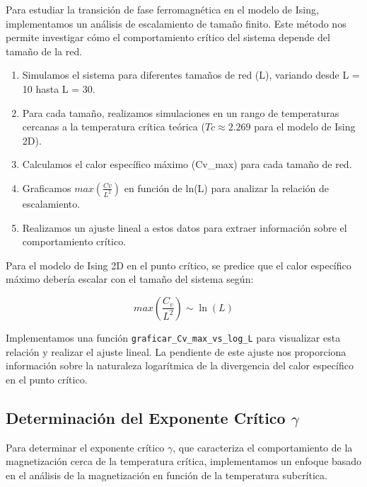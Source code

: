 \documentclass[twocolumn]{article}
\begin{document}
Para estudiar la transición de fase ferromagnética en el modelo de Ising, implementamos un análisis de escalamiento de tamaño finito. Este método nos permite investigar cómo el comportamiento crítico del sistema depende del tamaño de la red.

\begin{enumerate}
    \item Simulamos el sistema para diferentes tamaños de red (L), variando desde L = 10 hasta L = 30.
    \item Para cada tamaño, realizamos simulaciones en un rango de temperaturas cercanas a la temperatura crítica teórica ($Tc \approx 2.269$ para el modelo de Ising 2D).
    \item Calculamos el calor específico máximo (Cv\_max) para cada tamaño de red.
    \item Graficamos $max(\frac{Cv}{L^2})$ en función de ln(L) para analizar la relación de escalamiento.
    \item Realizamos un ajuste lineal a estos datos para extraer información sobre el comportamiento crítico.
\end{enumerate}

Para el modelo de Ising 2D en el punto crítico, se predice que el calor específico máximo debería escalar con el tamaño del sistema según:

\begin{equation}
    max(\frac{C_v}{L^2}) \sim \ln(L)
\end{equation}

Implementamos una función \texttt{graficar\_Cv\_max\_vs\_log\_L} para visualizar esta relación y realizar el ajuste lineal. La pendiente de este ajuste nos proporciona información sobre la naturaleza logarítmica de la divergencia del calor específico en el punto crítico.
 

\subsection*{Determinación del Exponente Crítico $\gamma$}

Para determinar el exponente crítico $\gamma$, que caracteriza el comportamiento de la magnetización cerca de la temperatura crítica, implementamos un enfoque basado en el análisis de la magnetización en función de la temperatura subcrítica.
\end{document}
